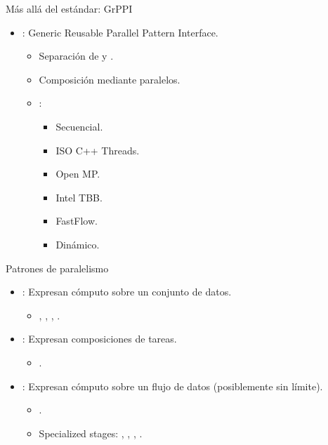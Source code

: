 \begin{frame}[t]{Más allá del estándar: GrPPI}
\begin{itemize}
  \item {}: Generic Reusable Parallel Pattern Interface.
    \begin{itemize}
      \vfill\item
      Separación de  y .

      \vfill\item
      Composición mediante  paralelos.

      \vfill\item
      :
        \begin{itemize}
        \item Secuencial.
        \item ISO C++ Threads.
        \item Open MP.
        \item Intel TBB.
        \item FastFlow.
        \item Dinámico.
        \end{itemize}
    \end{itemize}
\end{itemize}
\end{frame}

\begin{frame}[t]{Patrones de paralelismo}
\begin{itemize}
  \item {}: Expresan cómputo sobre un conjunto de datos.
    \begin{itemize}
      \item {}, , , .
    \end{itemize}

  \vfill\pause
  \item {}: Expresan composiciones de tareas.
    \begin{itemize}
      \item {}.
    \end{itemize}

  \vfill\pause
  \item {}: Expresan cómputo sobre un flujo de datos 
        (posiblemente sin límite).
    \begin{itemize}
      \item {}.
      \item Specialized stages: , , 
            , .
    \end{itemize}
\end{itemize}
\end{frame}

